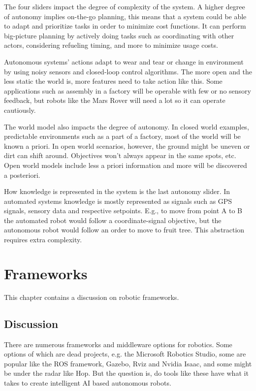 \documentclass[%
oneside,    %
project,    %
nosummary   %
]{USN-MSc}
\begin{document}
The four sliders impact the degree of complexity of the system. 
A higher degree of autonomy implies on-the-go planning, this means that a system could be able to adapt and prioritize tasks in order to minimize cost functions. It can perform big-picture planning by actively doing tasks such as coordinating with other actors, considering refueling timing, and more to minimize usage costs.

Autonomous systems' actions adapt to wear and tear or change in environment by using noisy sensors and closed-loop control algorithms. The more open and the less static the world is, more features need to take action like this. Some applications such as assembly in a factory will be operable with few or no sensory feedback, but robots like the Mars Rover will need a lot so it can operate cautiously. 

The world model also impacts the degree of autonomy. In closed world examples, predictable environments such as a part of a factory, most of the world will be known a priori. In open world scenarios, however, the ground might be uneven or dirt can shift around. Objectives won't always appear in the same spots, etc. Open world models include less a priori information and more will be discovered a posteriori.

How knowledge is represented in the system is the last autonomy slider. In automated systems knowledge is mostly represented as signals such as GPS signals, sensory data and respective setpoints. E.g., to move from point A to B the automated robot would follow a coordinate-signal objective, but the autonomous robot would follow an order to move to fruit tree. This abstraction requires extra complexity.

\chapter{Frameworks}
\label{ch:frame}
This chapter contains a discussion on robotic frameworks.
\section{Discussion}

There are numerous frameworks and middleware options for robotics. Some options of which are dead projects, e.g. the Microsoft Robotics Studio, some are popular like the ROS framework, Gazebo, Rviz and Nvidia Isaac, and some might be under the radar like Hop. But the question is, do tools like these have what it takes to create intelligent AI based autonomous robots.
\end{document}
